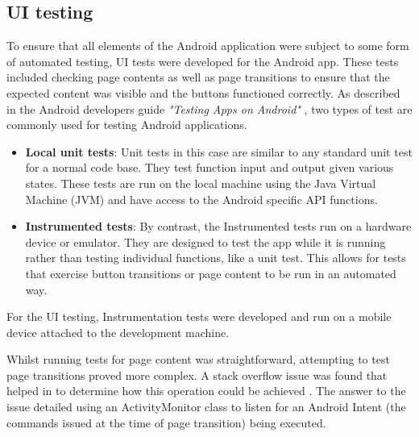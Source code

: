 \subsection{UI testing}
To ensure that all elements of the Android application were subject to some form of automated testing, UI tests were developed for the Android app. These tests included checking page contents as well as page transitions to ensure that the expected content was visible and the buttons functioned correctly. As described in the Android developers guide \textit{"Testing Apps on Android"} \cite{testing_apps_on_android}, two types of test are commonly used for testing Android applications.

\begin{itemize}
	\item \textbf{Local unit tests}: Unit tests in this case are similar to any standard unit test for a normal code base. They test function input and output given various states. These tests are run on the local machine using the Java Virtual Machine (JVM) and have access to the Android specific API functions.
	
	\item \textbf{Instrumented tests}: By contrast, the Instrumented tests run on a hardware device or emulator. They are designed to test the app while it is running rather than testing individual functions, like a unit test. This allows for tests that exercise button transitions or page content to be run in an automated way.
\end{itemize}

For the UI testing, Instrumentation tests were developed and run on a mobile device attached to the development machine.

Whilst running tests for page content was straightforward, attempting to test page transitions proved more complex. A stack overflow issue was found that helped in to determine how this operation could be achieved \cite{sof_android_button_test}. The answer to the issue detailed using an ActivityMonitor class to listen for an Android Intent (the commands issued at the time of page transition) being executed.



